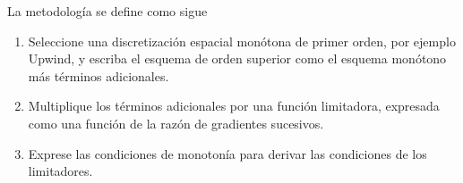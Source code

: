 La metodología se define como sigue
\begin{enumerate}
	\item

	      Seleccione una discretización espacial monótona de primer
	      orden, por ejemplo Upwind, y escriba el esquema de orden
	      superior como el esquema monótono más términos adicionales.

	\item

	      Multiplique los términos adicionales por una función
	      limitadora, expresada como una función de la razón de
	      gradientes sucesivos.

	\item

	      Exprese las condiciones de monotonía para derivar las
	      condiciones de los limitadores.
\end{enumerate}

